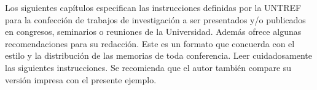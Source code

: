 Los siguientes capítulos especifican las instrucciones definidas por la UNTREF para la confección de trabajos de investigación a ser presentados y/o publicados en congresos, seminarios o reuniones de la Universidad. Además ofrece algunas recomendaciones para su redacción. Este es un formato que concuerda con el estilo y la distribución de las memorias de toda conferencia. Leer cuidadosamente las siguientes instrucciones. Se recomienda que el autor también compare su versión impresa con el presente ejemplo. 
